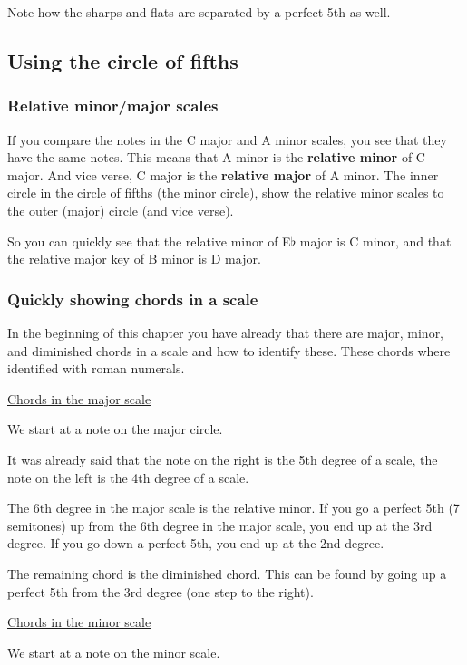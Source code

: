 Note how the sharps and flats are separated by a perfect 5th as well.

\newpage

\subsection{Using the circle of fifths}

\subsubsection{Relative minor/major scales}

If you compare the notes in the C major and A minor scales, you see that they have the same notes. This means that A minor is the \textbf{relative minor} of C major. And vice verse, C major is the \textbf{relative major} of A minor. The inner circle in the circle of fifths (the minor circle), show the relative minor scales to the outer (major) circle (and vice verse).

So you can quickly see that the relative minor of E$\flat$ major is C minor, and that the relative major key of B minor is D major.

\subsubsection{Quickly showing chords in a scale}

In the beginning of this chapter you have already that there are major, minor, and diminished chords in a scale and how to identify these. These chords where identified with roman numerals.

\underline{Chords in the major scale}

We start at a note on the major circle.

It was already said that the note on the right is the 5th degree of a scale, the note on the left is the 4th degree of a scale.

The 6th degree in the major scale is the relative minor. If you go a perfect 5th (7 semitones) up from the 6th degree in the major scale, you end up at the 3rd degree. If you go down a perfect 5th, you end up at the 2nd degree.

The remaining chord is the diminished chord. This can be found by going up a perfect 5th from the 3rd degree (one step to the right).

\underline{Chords in the minor scale}

We start at a note on the minor scale.

